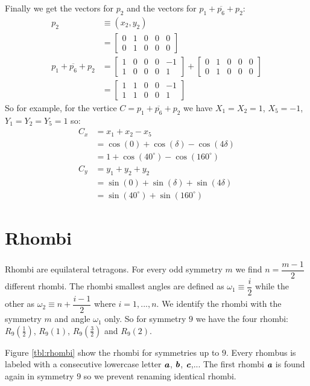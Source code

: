 \documentclass[11pt]{article}
\def\mathbi#1{\textbf{\em #1}}
\begin{document}
Finally we get the vectors for $p_2$ and the vectors for $p_1 + \overline{p_6} + p_2$:
\begin{align}
p_2 &\equiv (x_2,y_2)\nonumber\\ 
 &= \left[\begin{array}{ccccc}0&1&0&0&0 \\ 0&1&0&0&0 \end{array}\right]\\
p_1 + \overline{p_6} + p_2
 &= \left[\begin{array}{ccccc}1&0&0&0&-1 \\ 1&0&0&0&1 \end{array}\right]
 + \left[\begin{array}{ccccc}0&1&0&0&0 \\ 0&1&0&0&0 \end{array}\right]\\
 &= \left[\begin{array}{ccccc}1&1&0&0&-1 \\ 1&1&0&0&1 \end{array}\right]
\end{align}
So for example, for the vertice $C = p_1 + \overline{p_6} + p_2$ we have $X_1=X_2=1$, $X_5=-1$, $Y_1=Y_2=Y_5=1$ so:
\begin{align*}
C_x &= x_1 + x_2 - x_5\\
    &= \cos(0) + \cos(\delta) - \cos(4\delta)\\
    &= 1 + \cos(40^\circ) - \cos(160^\circ)\\
C_y &= y_1 + y_2 + y_2\nonumber\\
    &= \sin(0) + \sin(\delta) + \sin(4\delta)\\
    &= \sin(40^\circ) + \sin(160^\circ)
\end{align*}


\section{Rhombi}

Rhombi are equilateral tetragons. For every odd symmetry $m$ we find $n = \dfrac{m-1}2$ different rhombi. The rhombi smallest angles are defined as $\omega_1 \equiv \dfrac{i}2$ while the other as $\omega_2 \equiv n + \dfrac{i-1}2$ where $i = 1,...,n$. We identify the rhombi with the symmetry $m$ and angle $\omega_1$ only. So for symmetry $9$ we have the four rhombi: $R_9\left(\frac{1}2\right)$, $R_9(1)$, $R_9\left(\frac{3}2\right)$ and $R_9(2)$.

Figure \ref{tbl:rhombi} show the rhombi for symmetries up to $9$. Every rhombus is labeled with a consecutive lowercase letter $\mathbi{a}$, $\mathbi{b}$, $\mathbi{c}$,... The first rhombi $\mathbi{a}$ is found again in symmetry $9$ so we prevent renaming identical rhombi.
\end{document}
